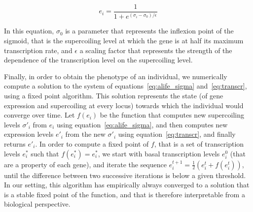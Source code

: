 \begin{equation}
e_i = \frac{1}{1 + e^{(\sigma_i - \sigma_0)/\epsilon}}
\label{eq:transcr}
\end{equation}

In this equation, $\sigma_0$ is a parameter that represents the inflexion point of the sigmoid, that is the supercoiling level at which the gene is at half its maximum transcription rate, and $\epsilon$ a scaling factor that represents the strength of the dependence of the transcription level on the supercoiling level.

Finally, in order to obtain the phenotype of an individual, we numerically compute a solution to the system of equations~\ref{eq:alife_sigma} and~\ref{eq:transcr}, using a fixed point algorithm.
This solution represents the state (of gene expression and supercoiling at every locus) towards which the individual would converge over time.
Let $f(e_i)$ be the function that computes new supercoiling levels $\sigma'_i$ from $e_i$ using equation~\ref{eq:alife_sigma}, and then computes new expression levels $e'_i$ from the new $\sigma'_i$ using equation~\ref{eq:transcr}, and finally returns $e'_i$.
In order to compute a fixed point of $f$, that is a set of transcription levels $e_i^*$ such that $f(e_i^*) = e_i^*$, we start with basal transcription levels $e_i^0$ (that are a property of each gene), and iterate the sequence $e_i^{t+1} = \frac{1}{2}(e_i^t + f(e_i^t))$, until the difference between two successive iterations is below a given threshold.
In our setting, this algorithm has empirically always converged to a solution that is a stable fixed point of the function, and that is therefore interpretable from a biological perspective.

